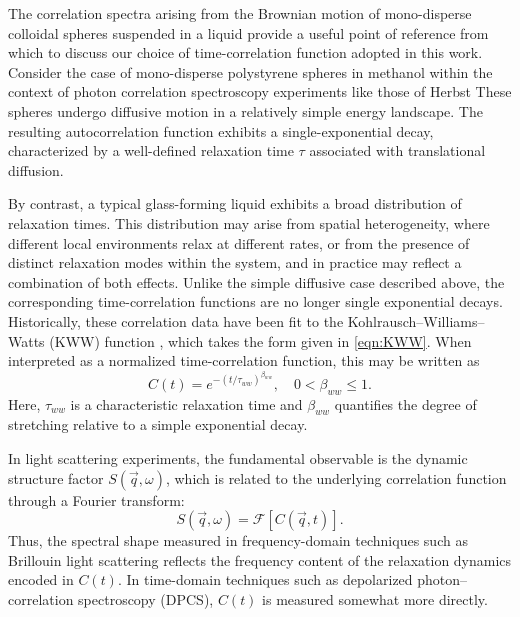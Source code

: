 The correlation spectra arising from the Brownian motion of mono-disperse colloidal spheres suspended in a liquid provide a useful point of reference from which to discuss our choice of time-correlation function adopted in this work. Consider the case of mono-disperse polystyrene spheres in methanol within the context of photon correlation spectroscopy experiments like those of Herbst \etal These spheres undergo diffusive motion in a relatively simple energy landscape. The resulting autocorrelation function exhibits a single-exponential decay, characterized by a well-defined relaxation time $\tau$ associated with translational diffusion.

By contrast, a typical glass-forming liquid exhibits a broad distribution of relaxation times. This distribution may arise from spatial heterogeneity, where different local environments relax at different rates, or from the presence of distinct relaxation modes within the system, and in practice may reflect a combination of both effects. Unlike the simple diffusive case described above, the corresponding time-correlation functions are no longer single exponential decays. Historically, these correlation data have been fit to the Kohlrausch--Williams--Watts (KWW) function \cite{Cardona2007,Williams}, which takes the form given in \eqn \ref{eqn:KWW}. When interpreted as a normalized time-correlation function, this may be written as
\begin{equation}
	C(t) = e^{-(t/\tau_{ww})^{\beta_{ww}}}, \quad 0 < \beta_{ww} \le 1.
	\label{eqn:KWWcorr}
\end{equation}
\noindent Here, $\tau_{ww}$ is a characteristic relaxation time and $\beta_{ww}$ quantifies the degree of stretching relative to a simple exponential decay.

In light scattering experiments, the fundamental observable is the dynamic structure factor $S(\vec q,\omega)$, which is related to the underlying correlation function through a Fourier transform:
\begin{equation}
	S(\vec q,\omega) = \mathscr{F}\!\left[ C(\vec q,t) \right].
	\label{eqn:SqwFromC}
\end{equation}
Thus, the spectral shape measured in frequency-domain techniques such as Brillouin light scattering reflects the frequency content of the relaxation dynamics encoded in $C(t)$. In time-domain techniques such as depolarized photon--correlation spectroscopy (DPCS), $C(t)$ is measured somewhat more directly.

